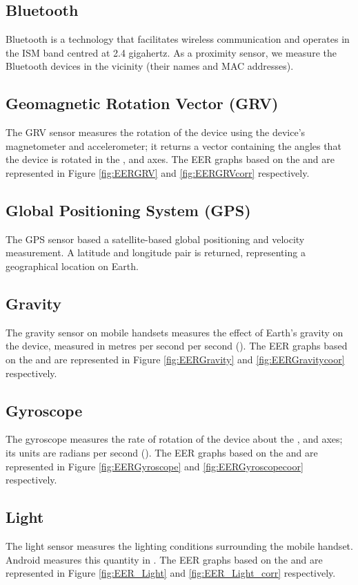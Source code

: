 \documentclass{article}
\begin{document}
\subsection{Bluetooth}
Bluetooth is a technology that facilitates wireless communication and operates in the ISM band centred at 2.4 gigahertz.  As a proximity sensor, we measure the Bluetooth devices in the vicinity (their names and MAC addresses).


\subsection{Geomagnetic Rotation Vector (GRV)}
The GRV sensor measures the rotation of the device using the device's magnetometer and accelerometer; it returns a vector containing the angles that the device is rotated in the ,  and  axes. The EER graphs based on the  and  are represented in Figure \ref{fig:EERGRV} and \ref{fig:EERGRVcorr} respectively.

\subsection{Global Positioning System (GPS)}
The GPS sensor based a satellite-based global positioning and velocity measurement. A latitude and longitude pair is returned, representing a geographical location on Earth.


\subsection{Gravity}
The gravity sensor on mobile handsets measures the effect of Earth's gravity on the device, measured in metres per second per second (). The EER graphs based on the  and  are represented in Figure \ref{fig:EERGravity} and \ref{fig:EERGravitycoor} respectively.

\subsection{Gyroscope}
The gyroscope measures the rate of rotation of the device about the ,  and  axes; its units are radians per second ().  The EER graphs based on the  and  are represented in Figure \ref{fig:EERGyroscope} and \ref{fig:EERGyroscopecoor} respectively.

\subsection{Light}
The light sensor measures the lighting conditions surrounding the mobile handset.  Android measures this quantity in .  The EER graphs based on the  and  are represented in Figure \ref{fig:EER_Light} and \ref{fig:EER_Light_corr} respectively.
\end{document}
